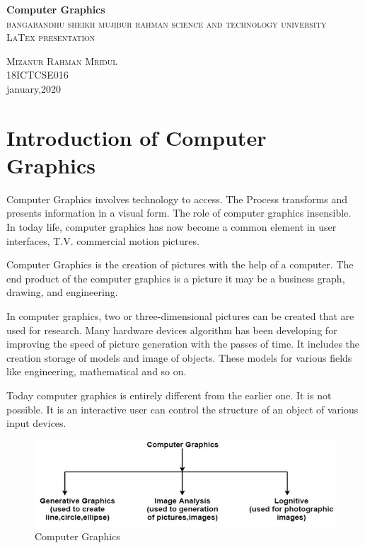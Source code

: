 \documentclass[a4paper]{article}
\begin{document}
  \begin{titlepage}
  \begin{center}
  
  \huge{\bfseries Computer Graphics}\\
  [2mm]
  
  \textsc{\LARGE bangabandhu sheikh mujibur rahman science and technology university}\\
  [.75cm]
  \textsc{\Large  LaTex presentation}\\
  [10cm]
  \end{center}
  
  \begin{flushright}
  \textsc{\huge Mizanur Rahman Mridul }\\
  \Large 18ICTCSE016\\
  january,2020
  \end{flushright}
  \end{titlepage}
  
 \section*{Introduction of Computer Graphics}
 
 Computer Graphics involves technology to access. The Process transforms and presents information in a visual form. The role of computer graphics insensible. In today life, computer graphics has now become a common element in user interfaces, T.V. commercial motion pictures.

Computer Graphics is the creation of pictures with the help of a computer. The end product of the computer graphics is a picture it may be a business graph, drawing, and engineering.


In computer graphics, two or three-dimensional pictures can be created that are used for research. Many hardware devices algorithm has been developing for improving the speed of picture generation with the passes of time. It includes the creation storage of models and image of objects. These models for various fields like engineering, mathematical and so on.

Today computer graphics is entirely different from the earlier one. It is not possible. It is an interactive user can control the structure of an object of various input devices.
\begin{figure}[h]
\centering
\includegraphics{cg}
\caption{Computer Graphics}
\end{figure}
\end{document}
